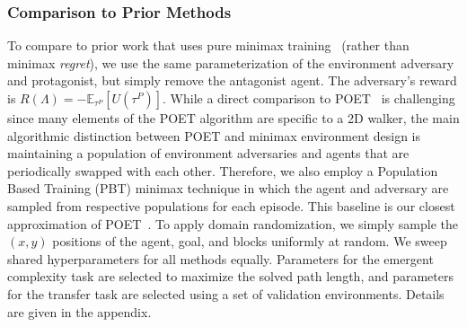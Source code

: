 \documentclass{article}
\begin{document}
\subsubsection{Comparison to Prior Methods}
To compare to prior work that uses pure minimax training~\citep{pinto2017supervision,vinitsky2020dmalt,morimoto2001robust} (rather than minimax \emph{regret}), we use the same parameterization of the environment adversary and protagonist, but simply remove the antagonist agent. The adversary's reward is $R(\Lambda) = - \mathbb{E}_{\tau^P}[U(\tau^P)]$. While a direct comparison to POET~\cite{wang2019paired} is challenging since many elements of the POET algorithm are specific to a 2D walker, the main algorithmic distinction between POET and minimax environment design is maintaining a population of environment adversaries and agents that are periodically swapped with each other. Therefore, we also employ a Population Based Training (PBT) minimax technique in which the agent and adversary are sampled from respective populations for each episode. This baseline is our closest approximation of POET~\cite{wang2019paired}. To apply domain randomization, we simply sample the $(x,y)$ positions of the  agent, goal, and blocks uniformly at random. We sweep shared hyperparameters for all methods equally. Parameters for the emergent complexity task are selected to maximize the solved path length, and parameters for the transfer task are selected using a set of validation environments. Details are given in the appendix. 
\end{document}
